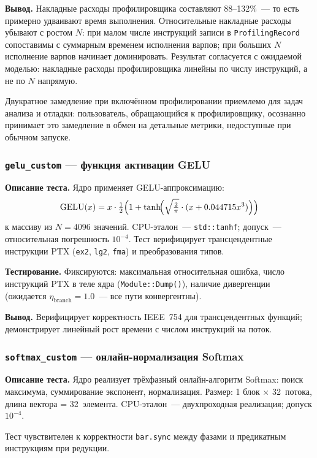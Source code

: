 \textbf{Вывод.}
Накладные расходы профилировщика составляют 88--132\%~--- то есть примерно
удваивают время выполнения. Относительные накладные расходы убывают с ростом $N$:
при малом числе инструкций записи в \texttt{ProfilingRecord}
сопоставимы с суммарным временем исполнения варпов;
при больших $N$ исполнение варпов начинает доминировать.
Результат согласуется с ожидаемой моделью: накладные расходы профилировщика
линейны по числу инструкций, а не по $N$ напрямую.

Двукратное замедление при включённом профилировании приемлемо для задач анализа и отладки: пользователь, обращающийся
к профилировщику, осознанно принимает это замедление в обмен на детальные
метрики, недоступные при обычном запуске.

\subsubsection{\texttt{gelu\_custom} --- функция активации GELU}

\textbf{Описание теста.}
Ядро применяет GELU-аппроксимацию:
\[
  \mathrm{GELU}(x) = x \cdot \tfrac{1}{2}
  \Bigl(1 + \tanh\!\Bigl(\sqrt{\tfrac{2}{\pi}} \cdot
  (x + 0.044715 x^3)\Bigr)\Bigr)
\]
к массиву из $N=4096$ значений. CPU-эталон~--- \texttt{std::tanhf};
допуск~--- относительная погрешность $10^{-4}$.
Тест верифицирует трансцендентные инструкции PTX (\texttt{ex2},
\texttt{lg2}, \texttt{fma}) и преобразования типов.

\textbf{Тестирование.}
Фиксируются: максимальная относительная ошибка, число инструкций
PTX в теле ядра (\texttt{Module::Dump()}), наличие дивергенции
(ожидается $\eta_{\mathrm{branch}} = 1.0$~--- все пути конвергентны).

\textbf{Вывод.}
Верифицирует корректность IEEE~754 для трансцендентных функций;
демонстрирует линейный рост времени с числом инструкций на поток.

\subsubsection{\texttt{softmax\_custom} --- онлайн-нормализация Softmax}

\textbf{Описание теста.}
Ядро реализует трёхфазный онлайн-алгоритм Softmax: поиск максимума,
суммирование экспонент, нормализация. Размер: 1 блок × 32~потока,
длина вектора = 32~элемента. CPU-эталон~--- двухпроходная реализация;
допуск $10^{-4}$.

Тест чувствителен к корректности \texttt{bar.sync} между фазами и
предикатным инструкциям при редукции.

